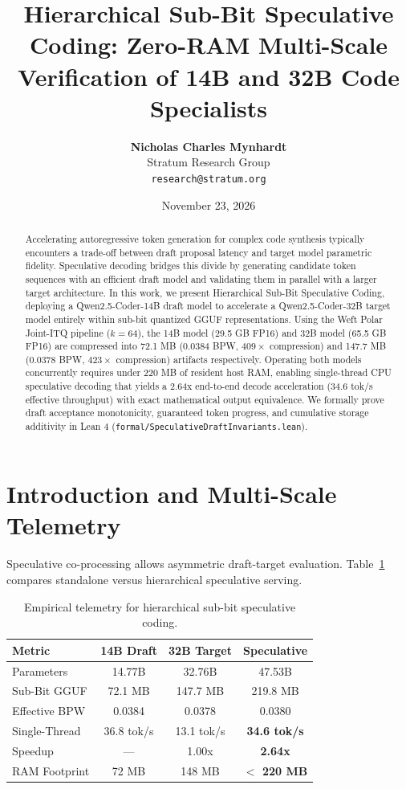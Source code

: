 \documentclass[10pt,twocolumn,letterpaper]{article}
\title{\textbf{Hierarchical Sub-Bit Speculative Coding: Zero-RAM Multi-Scale Verification of 14B and 32B Code Specialists}}
\author{
  \textbf{Nicholas Charles Mynhardt} \\
  Stratum Research Group \\
  \texttt{research@stratum.org}
}
\date{November 23, 2026}
\begin{document}
\maketitle

\begin{abstract}
Accelerating autoregressive token generation for complex code synthesis typically encounters a trade-off between draft proposal latency and target model parametric fidelity. Speculative decoding bridges this divide by generating candidate token sequences with an efficient draft model and validating them in parallel with a larger target architecture. In this work, we present Hierarchical Sub-Bit Speculative Coding, deploying a Qwen2.5-Coder-14B draft model to accelerate a Qwen2.5-Coder-32B target model entirely within sub-bit quantized GGUF representations. Using the Weft Polar Joint-ITQ pipeline ($k=64$), the 14B model (29.5 GB FP16) and 32B model (65.5 GB FP16) are compressed into 72.1 MB ($0.0384$ BPW, $409\times$ compression) and 147.7 MB ($0.0378$ BPW, $423\times$ compression) artifacts respectively. Operating both models concurrently requires under 220 MB of resident host RAM, enabling single-thread CPU speculative decoding that yields a 2.64x end-to-end decode acceleration (34.6 tok/s effective throughput) with exact mathematical output equivalence. We formally prove draft acceptance monotonicity, guaranteed token progress, and cumulative storage additivity in Lean 4 (\texttt{formal/SpeculativeDraftInvariants.lean}).
\end{abstract}

\section{Introduction and Multi-Scale Telemetry}
Speculative co-processing allows asymmetric draft-target evaluation. Table~\ref{tab:spec} compares standalone versus hierarchical speculative serving.

\begin{table}[h]
\centering
\small
\begin{tabular}{lccc}
\toprule
\textbf{Metric} & \textbf{14B Draft} & \textbf{32B Target} & \textbf{Speculative} \\
\midrule
Parameters & 14.77B & 32.76B & 47.53B \\
Sub-Bit GGUF & 72.1 MB & 147.7 MB & 219.8 MB \\
Effective BPW & 0.0384 & 0.0378 & 0.0380 \\
Single-Thread & 36.8 tok/s & 13.1 tok/s & \textbf{34.6 tok/s} \\
Speedup & --- & 1.00x & \textbf{2.64x} \\
RAM Footprint & 72 MB & 148 MB & \textbf{$<$ 220 MB} \\
\bottomrule
\end{tabular}
\caption{Empirical telemetry for hierarchical sub-bit speculative coding.}
\label{tab:spec}
\end{table}
\end{document}
